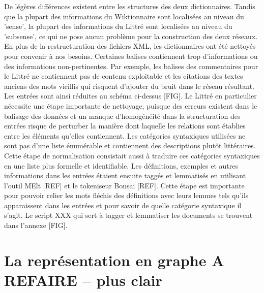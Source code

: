 \documentclass{article}
\begin{document}
\begin{figure}
\centering
\def\svgwidth{\columnwidth}

\end{figure}


De légères différences existent entre les structures des deux dictionnaires. Tandis que la plupart des informations du Wiktionnaire sont localisées au niveau du 'sense', la plupart des informations du Littré sont localisées au niveau du 'subsense', ce qui ne pose aucun problème pour la construction des deux réseaux.
\newline
\newline
En plus de la restructuration des fichiers XML, les dictionnaires ont été nettoyés pour convenir à nos besoins. Certaines balises contiennent trop d'informations ou des informations non-pertinentes. Par exemple, les balises des commentaires pour le Littré ne contiennent pas de contenu exploitable et les citations des textes anciens des mots vieillis qui risquent d'ajouter du bruit dans le réseau résultant. Les entrées sont ainsi réduites au schéma ci-dessus [FIG]. Le Littré en particulier nécessite une étape importante de nettoyage, puisque des erreurs existent dans le balisage des données et un manque d'homogénéité dans la structuration des entrées risque de perturber la manière dont laquelle les relations sont établies entre les éléments qu'elles contiennent. Les catégories syntaxiques utilisées ne sont pas d'une liste énumérable et contiennent des descriptions plutôt littéraires. Cette étape de normalisation consistait aussi à traduire ces catégories syntaxiques en une liste plus formelle et identifiable.
\newline
\newline
Les définitions, exemples et autres informations dans les entrées étaient ensuite taggés et lemmatisés en utilisant l'outil MElt [REF] et le tokeniseur Bonsai [REF]. Cette étape est importante pour pouvoir relier les mots fléchis des définitions avec leurs lemmes tels qu'ils apparaissent dans les entrées et pour savoir de quelle catégorie syntaxique il s'agit. Le script XXX qui sert à tagger et lemmatiser les documents se trouvent dans l'annexe [FIG].

\section{La représentation en graphe A REFAIRE – plus clair}
\end{document}
